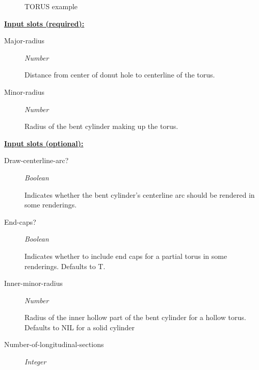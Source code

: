 \documentclass [11pt]{book}
\begin{document}
\begin{itemize}
\begin{figure}
\caption{TORUS example}

\label{fig:TORUS}

\end{figure}





\textbf{
\underline{Input slots (required):}}

\begin{description}

\item [Major-radius]
\emph{Number}

 Distance from center of donut hole to centerline of the torus.




\item [Minor-radius]
\emph{Number}

 Radius of the bent cylinder making up the torus.




\end{description}






\textbf{
\underline{Input slots (optional):}}

\begin{description}

\item [Draw-centerline-arc?]
\emph{Boolean}

 Indicates whether the bent cylinder's centerline arc should be rendered in some renderings.




\item [End-caps?]
\emph{Boolean}

 Indicates whether to include end caps for a partial torus in some renderings. Defaults to T.




\item [Inner-minor-radius]
\emph{Number}

 Radius of the inner hollow part of the bent cylinder for a hollow torus. Defaults to NIL for a solid cylinder




\item [Number-of-longitudinal-sections]
\emph{Integer}


\end{description}
\end{itemize}
\end{document}
